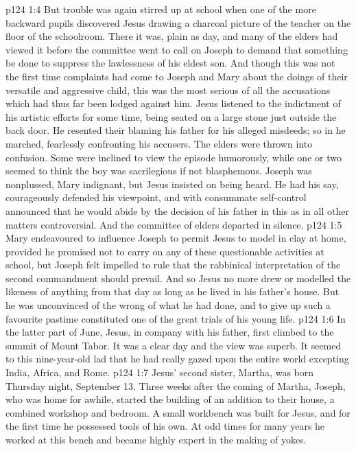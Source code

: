 \vs p124 1:4 But trouble was again stirred up at school when one of the more backward pupils discovered Jesus drawing a charcoal picture of the teacher on the floor of the schoolroom. There it was, plain as day, and many of the elders had viewed it before the committee went to call on Joseph to demand that something be done to suppress the lawlessness of his eldest son. And though this was not the first time complaints had come to Joseph and Mary about the doings of their versatile and aggressive child, this was the most serious of all the accusations which had thus far been lodged against him. Jesus listened to the indictment of his artistic efforts for some time, being seated on a large stone just outside the back door. He resented their blaming his father for his alleged misdeeds; so in he marched, fearlessly confronting his accusers. The elders were thrown into confusion. Some were inclined to view the episode humorously, while one or two seemed to think the boy was sacrilegious if not blasphemous. Joseph was nonplussed, Mary indignant, but Jesus insisted on being heard. He had his say, courageously defended his viewpoint, and with consummate self\hyp{}control announced that he would abide by the decision of his father in this as in all other matters controversial. And the committee of elders departed in silence.
\vs p124 1:5 Mary endeavoured to influence Joseph to permit Jesus to model in clay at home, provided he promised not to carry on any of these questionable activities at school, but Joseph felt impelled to rule that the rabbinical interpretation of the second commandment should prevail. And so Jesus no more drew or modelled the likeness of anything from that day as long as he lived in his father’s house. But he was unconvinced of the wrong of what he had done, and to give up such a favourite pastime constituted one of the great trials of his young life.
\vs p124 1:6 \pc In the latter part of June, Jesus, in company with his father, first climbed to the summit of Mount Tabor. It was a clear day and the view was superb. It seemed to this nine\hyp{}year\hyp{}old lad that he had really gazed upon the entire world excepting India, Africa, and Rome.
\vs p124 1:7 \pc Jesus’ second sister, Martha, was born Thursday night, September 13. Three weeks after the coming of Martha, Joseph, who was home for awhile, started the building of an addition to their house, a combined workshop and bedroom. A small workbench was built for Jesus, and for the first time he possessed tools of his own. At odd times for many years he worked at this bench and became highly expert in the making of yokes.
